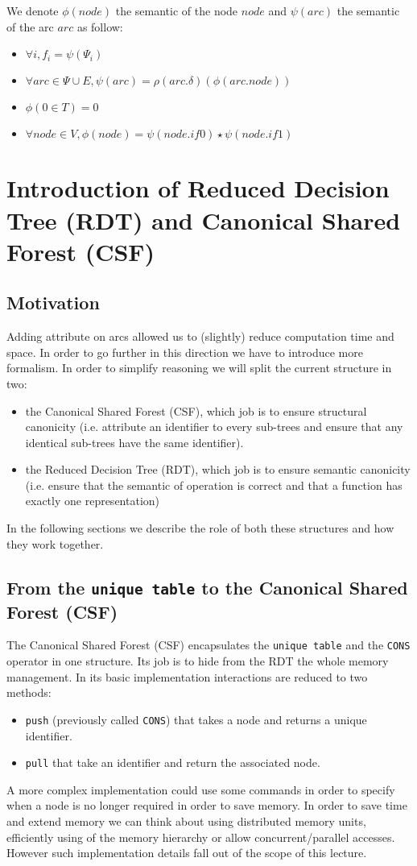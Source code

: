\documentclass[a4paper,10pt]{article}
\begin{document}

We denote $\phi(node)$ the semantic of the node $node$ and $\psi(arc)$ the semantic of the arc $arc$ as follow:\begin{itemize}
\item $\forall i, f_i = \psi(\Psi_i)$
\item $\forall arc \in \Psi \cup E, \psi(arc) = \rho(arc.\delta)(\phi(arc.node))$
\item $\phi(0 \in T) = 0$
\item $\forall node \in V, \phi(node) = \psi(node.if0) \star \psi(node.if1)$
\end{itemize}


\section{Introduction of Reduced Decision Tree (RDT) and Canonical Shared Forest (CSF)}
\subsection{Motivation}
Adding attribute on arcs allowed us to (slightly) reduce computation time and space.
In order to go further in this direction we have to introduce more formalism.
In order to simplify reasoning we will split the current structure in two:\begin{itemize}
\item the Canonical Shared Forest (CSF), which job is to ensure structural canonicity (i.e. attribute an identifier to every sub-trees and ensure that any identical sub-trees have the same identifier).
\item the Reduced Decision Tree (RDT), which job is to ensure semantic canonicity (i.e. ensure that the semantic of operation is correct and that a function has exactly one representation)
\end{itemize}
In the following sections we describe the role of both these structures and how they work together.

\subsection{From the \texttt{unique table} to the Canonical Shared Forest (CSF)}
The Canonical Shared Forest (CSF) encapsulates the \texttt{unique table} and the \texttt{CONS} operator in one structure.
Its job is to hide from the RDT the whole memory management.
In its basic implementation interactions are reduced to two methods:\begin{itemize}
\item \texttt{push} (previously called \texttt{CONS}) that takes a node and returns a unique identifier.
\item \texttt{pull} that take an identifier and return the associated node.
\end{itemize}
A more complex implementation could use some commands in order to specify when a node is no longer required in order to save memory.
In order to save time and extend memory we can think about using distributed memory units, efficiently using of the memory hierarchy or allow concurrent/parallel accesses.
However such implementation details fall out of the scope of this lecture.
\end{document}
